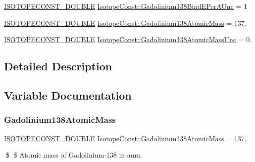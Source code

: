 \begin{DoxyCompactItemize}
\mbox{\hyperlink{group___isotope_const-_macros_ga8f45a7272ce02c0b4c65c44636ed719a}{I\+S\+O\+T\+O\+P\+E\+C\+O\+N\+S\+T\+\_\+\+D\+O\+U\+B\+LE}} \mbox{\hyperlink{group___isotope_const-_gadolinium-_gd138_gad4cb21d00b5a4d6cb485892aed97072f}{Isotope\+Const\+::\+Gadolinium138\+Bind\+E\+Per\+A\+Unc}} = 1
\item 
\mbox{\hyperlink{group___isotope_const-_macros_ga8f45a7272ce02c0b4c65c44636ed719a}{I\+S\+O\+T\+O\+P\+E\+C\+O\+N\+S\+T\+\_\+\+D\+O\+U\+B\+LE}} \mbox{\hyperlink{group___isotope_const-_gadolinium-_gd138_ga890a8c2e7455a3b2b99388184de00826}{Isotope\+Const\+::\+Gadolinium138\+Atomic\+Mass}} = 137.
\item 
\mbox{\hyperlink{group___isotope_const-_macros_ga8f45a7272ce02c0b4c65c44636ed719a}{I\+S\+O\+T\+O\+P\+E\+C\+O\+N\+S\+T\+\_\+\+D\+O\+U\+B\+LE}} \mbox{\hyperlink{group___isotope_const-_gadolinium-_gd138_ga6e0fb54058e607b6795bd6e5fbbd1ea7}{Isotope\+Const\+::\+Gadolinium138\+Atomic\+Mass\+Unc}} = 0.
\end{DoxyCompactItemize}


\subsection{Detailed Description}


\subsection{Variable Documentation}
\mbox{\label{group___isotope_const-_gadolinium-_gd138_ga890a8c2e7455a3b2b99388184de00826}} 
\subsubsection{\texorpdfstring{Gadolinium138\+Atomic\+Mass}{Gadolinium138AtomicMass}}
{\footnotesize\ttfamily \mbox{\hyperlink{group___isotope_const-_macros_ga8f45a7272ce02c0b4c65c44636ed719a}{I\+S\+O\+T\+O\+P\+E\+C\+O\+N\+S\+T\+\_\+\+D\+O\+U\+B\+LE}} Isotope\+Const\+::\+Gadolinium138\+Atomic\+Mass = 137.}

\$ \$ Atomic mass of Gadolinium-\/138 in amu. \mbox{\label{group___isotope_const-_gadolinium-_gd138_ga6e0fb54058e607b6795bd6e5fbbd1ea7}} 
